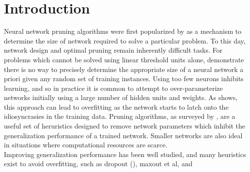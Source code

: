 \section{Introduction}
Neural network pruning algorithms were first popularized by \cite{sietsma1988neural} as a mechanism to determine the size of network required to solve a particular problem. To this day, network design and optimal pruning remain inherently difficult tasks. For problems which cannot be solved using linear threshold units alone, \cite{baum1989size} demonstrate there is no way to precisely determine the appropriate size of a neural network a priori given any random set of training instances. Using too few neurons inhibits learning, and so in practice it is common to attempt to over-parameterize networks initially using a large number of hidden units and weights. As \cite{chauvin1990generalization} shows, this approach can lead to overfitting as the network starts to latch onto the idiosyncrasies in the training data. Pruning algorithms, as surveyed by \cite{reed1993pruning}, are a useful set of heruristics designed to remove network parameters which inhibit the generalization performance of a trained network. Smaller networks are also ideal in situations where computational resources are scarce.
\\
Improving generalization performance has been well studied, and many heuristics exist to avoid overfitting, such as dropout (), maxout et al, and  